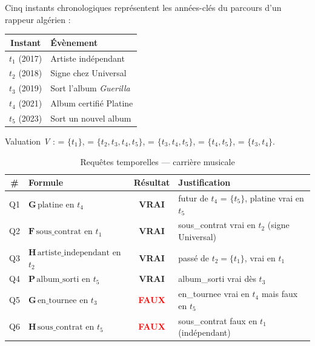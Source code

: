 Cinq instants chronologiques représentent les années-clés du parcours d'un
rappeur algérien :

\begin{center}\small
\begin{tabular}{cl}
\toprule
\textbf{Instant} & \textbf{Évènement} \\
\midrule
$t_1$ (2017) & Artiste indépendant \\
$t_2$ (2018) & Signe chez Universal \\
$t_3$ (2019) & Sort l'album \emph{Guerilla} \\
$t_4$ (2021) & Album certifié Platine \\
$t_5$ (2023) & Sort un nouvel album \\
\bottomrule
\end{tabular}
\end{center}

\noindent Valuation \emph{V} :
 = $\{t_1\}$,
 = $\{t_2, t_3, t_4, t_5\}$,
 = $\{t_3, t_4, t_5\}$,
 = $\{t_4, t_5\}$,
 = $\{t_3, t_4\}$.

\begin{table}[H]
\centering
\caption{Requêtes temporelles --- carrière musicale}
\begin{tabularx}{\linewidth}{clcX}
\toprule
\textbf{\#} & \textbf{Formule} & \textbf{Résultat} & \textbf{Justification} \\
\midrule
Q1 & $\mathbf{G}\,\text{platine}$ en $t_4$
   & \textcolor{codegreen}{\textbf{VRAI}}
   & futur de $t_4$ = $\{t_5\}$, platine vrai en $t_5$ \\
Q2 & $\mathbf{F}\,\text{sous\_contrat}$ en $t_1$
   & \textcolor{codegreen}{\textbf{VRAI}}
   & sous\_contrat vrai en $t_2$ (signe Universal) \\
Q3 & $\mathbf{H}\,\text{artiste\_independant}$ en $t_2$
   & \textcolor{codegreen}{\textbf{VRAI}}
   & passé de $t_2 = \{t_1\}$, vrai en $t_1$ \\
Q4 & $\mathbf{P}\,\text{album\_sorti}$ en $t_5$
   & \textcolor{codegreen}{\textbf{VRAI}}
   & album\_sorti vrai dès $t_3$ \\
Q5 & $\mathbf{G}\,\text{en\_tournee}$ en $t_3$
   & \textcolor{red}{\textbf{FAUX}}
   & en\_tournee vrai en $t_4$ mais faux en $t_5$ \\
Q6 & $\mathbf{H}\,\text{sous\_contrat}$ en $t_5$
   & \textcolor{red}{\textbf{FAUX}}
   & sous\_contrat faux en $t_1$ (indépendant) \\
\bottomrule
\end{tabularx}
\end{table}


